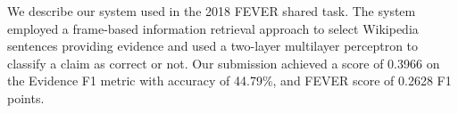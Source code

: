 We describe our system used in the 2018 FEVER shared task. The system employed a frame-based information retrieval approach to select Wikipedia sentences providing evidence and used a two-layer multilayer perceptron to classify a claim as correct or not. Our submission achieved a score of 0.3966 on the Evidence F1 metric with accuracy of 44.79\%, and FEVER score of 0.2628 F1 points.

